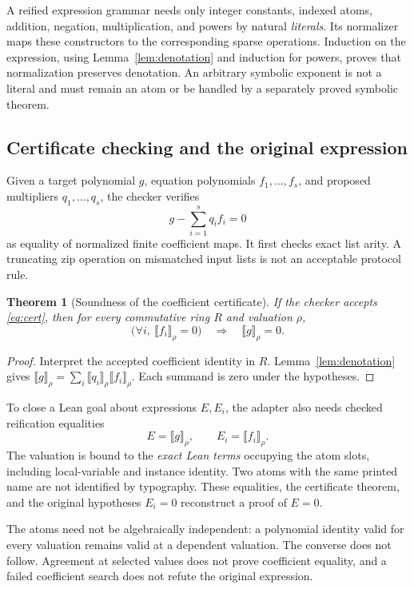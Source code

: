 \documentclass[11pt,a4paper]{article}
\newcommand{\den}[1]{\llbracket #1\rrbracket}
\theoremstyle{plain}\newtheorem{proposition}{Proposition}[section]
\newtheorem{theorem}[proposition]{Theorem}
\theoremstyle{definition}\newtheorem{definition}[proposition]{Definition}
\theoremstyle{remark}\newtheorem{remark}[proposition]{Remark}
\begin{document}
A reified expression grammar needs only integer constants, indexed atoms, addition, negation, multiplication, and powers by natural \emph{literals}. Its normalizer maps these constructors to the corresponding sparse operations. Induction on the expression, using Lemma~\ref{lem:denotation} and induction for powers, proves that normalization preserves denotation. An arbitrary symbolic exponent is not a literal and must remain an atom or be handled by a separately proved symbolic theorem.

\subsection{Certificate checking and the original expression}
Given a target polynomial \(g\), equation polynomials \(f_1,\ldots,f_s\), and proposed multipliers \(q_1,\ldots,q_s\), the checker verifies
\begin{equation}\label{eq:cert}
 g-\sum_{i=1}^{s}q_i f_i=0
\end{equation}
as equality of normalized finite coefficient maps. It first checks exact list arity. A truncating zip operation on mismatched input lists is not an acceptable protocol rule.

\begin{theorem}[Soundness of the coefficient certificate]\label{thm:cert}
If the checker accepts \eqref{eq:cert}, then for every commutative ring \(R\) and valuation \(\rho\),
\[
 \bigl(\forall i,\ \den{f_i}_{\rho}=0\bigr)
 \quad\Longrightarrow\quad \den g_{\rho}=0.
\]
\end{theorem}
\begin{proof}
Interpret the accepted coefficient identity in \(R\). Lemma~\ref{lem:denotation} gives
\(\den g_{\rho}=\sum_i\den{q_i}_{\rho}\den{f_i}_{\rho}\).
Each summand is zero under the hypotheses.
\end{proof}

To close a Lean goal about expressions \(E,E_i\), the adapter also needs checked reification equalities
\[
 E=\den g_{\rho},\qquad E_i=\den{f_i}_{\rho}.
\]
The valuation is bound to the \emph{exact Lean terms} occupying the atom slots, including local-variable and instance identity. Two atoms with the same printed name are not identified by typography. These equalities, the certificate theorem, and the original hypotheses \(E_i=0\) reconstruct a proof of \(E=0\).

The atoms need not be algebraically independent: a polynomial identity valid for every valuation remains valid at a dependent valuation. The converse does not follow. Agreement at selected values does not prove coefficient equality, and a failed coefficient search does not refute the original expression.
\end{document}
